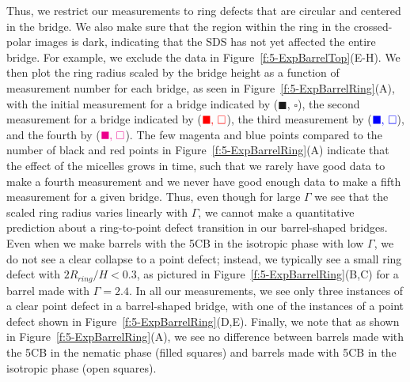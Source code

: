 Thus, we restrict our measurements to ring defects that are circular and centered in the bridge.
We also make sure that the region within the ring in the crossed-polar images is dark, indicating that the SDS has not yet affected the entire bridge.
For example, we exclude the data in Figure~\ref{f:5-ExpBarrelTop}(E-H).
We then plot the ring radius scaled by the bridge height as a function of measurement number for each bridge, as seen in Figure~\ref{f:5-ExpBarrelRing}(A), with the initial measurement for a bridge indicated by (${\blacksquare,\, \square}$), the second measurement for a bridge indicated by (${\color{red} \blacksquare,\, \square}$), the third measurement by (${\color{blue} \blacksquare,\, \square}$), and the fourth by (${\color{magenta} \blacksquare,\, \square}$).
The few magenta and blue points compared to the number of black and red points in Figure~\ref{f:5-ExpBarrelRing}(A) indicate that the effect of the micelles grows in time, such that we rarely have good data to make a fourth measurement and we never have good enough data to make a fifth measurement for a given bridge.
Thus, even though for large $\Gamma$ we see that the scaled ring radius varies linearly with $\Gamma$, we cannot make a quantitative prediction about a ring-to-point defect transition in our barrel-shaped bridges.
Even when we make barrels with the 5CB in the isotropic phase with low $\Gamma$, we do not see a clear collapse to a point defect; instead, we typically see a small ring defect with $2 R_{ring}/H < 0.3$, as pictured in Figure~\ref{f:5-ExpBarrelRing}(B,C) for a barrel made with $\Gamma = 2.4$.
In all our measurements, we see only three instances of a clear point defect in a barrel-shaped bridge, with one of the instances of a point defect shown in Figure~\ref{f:5-ExpBarrelRing}(D,E).
Finally, we note that as shown in Figure~\ref{f:5-ExpBarrelRing}(A), we see no difference between barrels made with the 5CB in the nematic phase (filled squares) and barrels made with 5CB in the isotropic phase (open squares).
